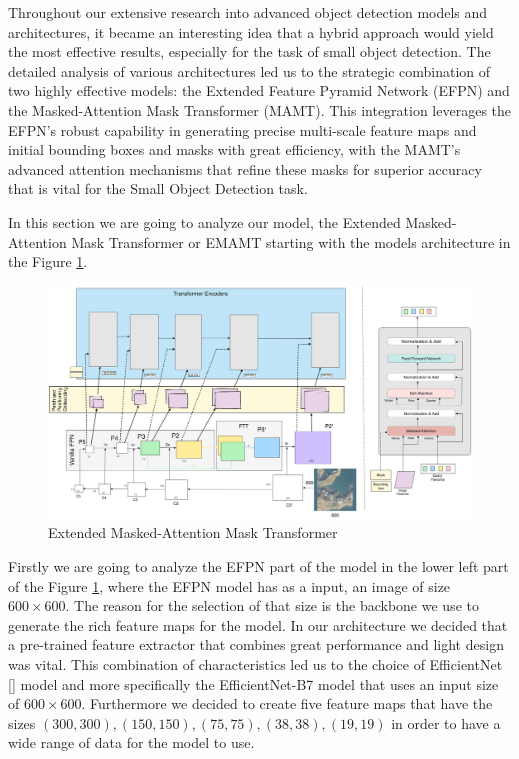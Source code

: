 Throughout our extensive research into advanced object detection models and architectures, it became an interesting idea that a hybrid approach would 
yield the most effective results, especially for the task of small object detection. The detailed analysis of various architectures led us to the strategic 
combination of two highly effective models: the Extended Feature Pyramid Network (EFPN) and the Masked-Attention Mask Transformer (MAMT). 
This integration leverages the EFPN’s robust capability in generating precise multi-scale feature maps and initial bounding boxes and masks with great efficiency, 
with the MAMT’s advanced attention mechanisms that refine these masks for superior accuracy that is vital for the Small Object Detection task. 

In this section we are going to analyze our model, the Extended Masked-Attention Mask Transformer or EMAMT starting with the models architecture in the Figure
\ref{fig:emamt}.

\begin{figure}[h!]
    \includegraphics[scale=0.05]{Figures/EMAMT.png}
    \caption{Extended Masked-Attention Mask Transformer}
    \label{fig:emamt}
\end{figure}

Firstly we are going to analyze the EFPN part of the model in the lower left part of the Figure \ref{fig:emamt}, where the EFPN model has as a input,
an image of size $600 \times 600$. The reason for the selection of that size is the backbone we use to generate the rich feature maps for the model.
In our architecture we decided that a pre-trained feature extractor that combines great performance and light design was vital. This combination of characteristics
led us to the choice of EfficientNet [] model and more specifically the EfficientNet-B7 model that uses an input size of $600 \times 600$. Furthermore we decided 
to create five feature maps that have the sizes $(300, 300), (150, 150), (75, 75), (38, 38), (19, 19)$ in order to have a wide range of data for the model to use. 

